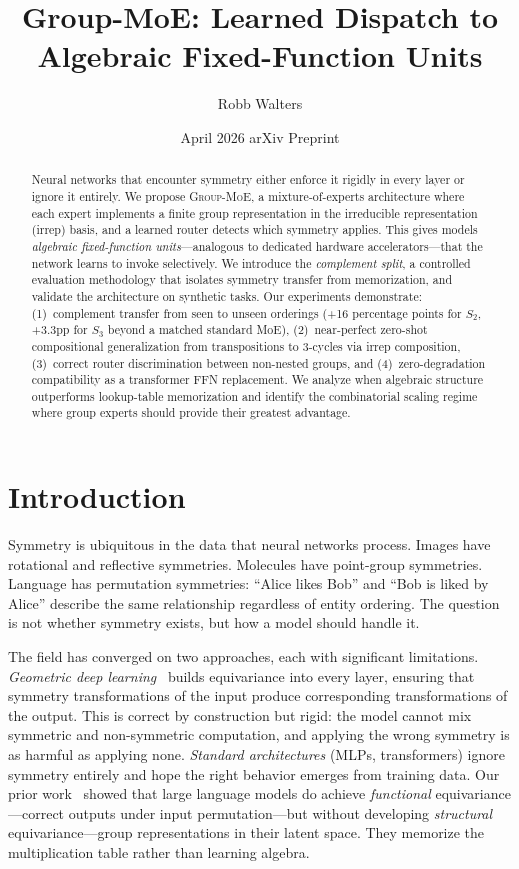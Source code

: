 \documentclass[10pt, letterpaper]{article}
\title{Group-MoE: Learned Dispatch to Algebraic Fixed-Function Units}
\author{Robb Walters}
\date{April 2026 \quad\textbar\quad arXiv Preprint}
\newcommand{\gmoe}{\textsc{Group-MoE}}
\begin{document}
\maketitle

\begin{abstract}
Neural networks that encounter symmetry either enforce it rigidly in every layer or ignore it entirely. We propose \gmoe{}, a mixture-of-experts architecture where each expert implements a finite group representation in the irreducible representation (irrep) basis, and a learned router detects which symmetry applies. This gives models \emph{algebraic fixed-function units}---analogous to dedicated hardware accelerators---that the network learns to invoke selectively. We introduce the \emph{complement split}, a controlled evaluation methodology that isolates symmetry transfer from memorization, and validate the architecture on synthetic tasks. Our experiments demonstrate: (1)~complement transfer from seen to unseen orderings (+16 percentage points for $S_2$, +3.3pp for $S_3$ beyond a matched standard MoE), (2)~near-perfect zero-shot compositional generalization from transpositions to 3-cycles via irrep composition, (3)~correct router discrimination between non-nested groups, and (4)~zero-degradation compatibility as a transformer FFN replacement. We analyze when algebraic structure outperforms lookup-table memorization and identify the combinatorial scaling regime where group experts should provide their greatest advantage.
\end{abstract}

\section{Introduction}
\label{sec:intro}

Symmetry is ubiquitous in the data that neural networks process. Images have rotational and reflective symmetries. Molecules have point-group symmetries. Language has permutation symmetries: ``Alice likes Bob'' and ``Bob is liked by Alice'' describe the same relationship regardless of entity ordering. The question is not whether symmetry exists, but how a model should handle it.

The field has converged on two approaches, each with significant limitations. \emph{Geometric deep learning}~\cite{bronstein2021geometric, cohen2016group} builds equivariance into every layer, ensuring that symmetry transformations of the input produce corresponding transformations of the output. This is correct by construction but rigid: the model cannot mix symmetric and non-symmetric computation, and applying the wrong symmetry is as harmful as applying none. \emph{Standard architectures} (MLPs, transformers) ignore symmetry entirely and hope the right behavior emerges from training data. Our prior work~\cite{walters2025ordering} showed that large language models do achieve \emph{functional} equivariance---correct outputs under input permutation---but without developing \emph{structural} equivariance---group representations in their latent space. They memorize the multiplication table rather than learning algebra.
\end{document}
